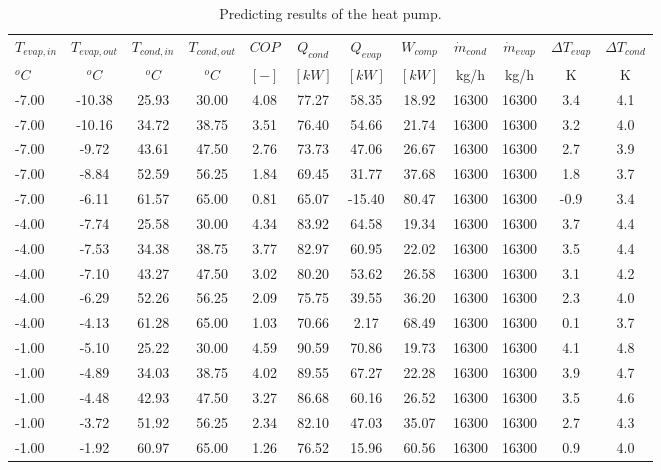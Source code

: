 \documentclass[english]{SPFShortReport}
\begin{document}
\begin{table}[!ht]
\begin{small}
\caption{Predicting results of the heat pump.}
\begin{center}
\resizebox{12cm}{!} 
{
\begin{tabular}{l | c c c c c c c c c c c } 
\hline
\hline
$T_{evap,in}$ &$T_{evap,out}$ &$T_{cond,in}$ &$T_{cond,out}$ &$COP$ &$Q_{cond}$ &$Q_{evap}$ &$W_{comp}$ &$\dot m_{cond}$ &$\dot m_{evap}$ &$\Delta T_{evap}$ &$\Delta T_{cond}$ \\ 
$^oC$ &$^oC$ &$^oC$ &$^oC$ &$[-]$ &$[kW]$ &$[kW]$ &$[kW]$ &kg/h &kg/h &K &K\\ 
\hline
-7.00 & -10.38 & 25.93 & 30.00 & 4.08 & 77.27 & 58.35 & 18.92 & 16300 & 16300 & 3.4 & 4.1\\ 
-7.00 & -10.16 & 34.72 & 38.75 & 3.51 & 76.40 & 54.66 & 21.74 & 16300 & 16300 & 3.2 & 4.0\\ 
-7.00 & -9.72 & 43.61 & 47.50 & 2.76 & 73.73 & 47.06 & 26.67 & 16300 & 16300 & 2.7 & 3.9\\ 
-7.00 & -8.84 & 52.59 & 56.25 & 1.84 & 69.45 & 31.77 & 37.68 & 16300 & 16300 & 1.8 & 3.7\\ 
-7.00 & -6.11 & 61.57 & 65.00 & 0.81 & 65.07 & -15.40 & 80.47 & 16300 & 16300 & -0.9 & 3.4\\ 
-4.00 & -7.74 & 25.58 & 30.00 & 4.34 & 83.92 & 64.58 & 19.34 & 16300 & 16300 & 3.7 & 4.4\\ 
-4.00 & -7.53 & 34.38 & 38.75 & 3.77 & 82.97 & 60.95 & 22.02 & 16300 & 16300 & 3.5 & 4.4\\ 
-4.00 & -7.10 & 43.27 & 47.50 & 3.02 & 80.20 & 53.62 & 26.58 & 16300 & 16300 & 3.1 & 4.2\\ 
-4.00 & -6.29 & 52.26 & 56.25 & 2.09 & 75.75 & 39.55 & 36.20 & 16300 & 16300 & 2.3 & 4.0\\ 
-4.00 & -4.13 & 61.28 & 65.00 & 1.03 & 70.66 & 2.17 & 68.49 & 16300 & 16300 & 0.1 & 3.7\\ 
-1.00 & -5.10 & 25.22 & 30.00 & 4.59 & 90.59 & 70.86 & 19.73 & 16300 & 16300 & 4.1 & 4.8\\ 
-1.00 & -4.89 & 34.03 & 38.75 & 4.02 & 89.55 & 67.27 & 22.28 & 16300 & 16300 & 3.9 & 4.7\\ 
-1.00 & -4.48 & 42.93 & 47.50 & 3.27 & 86.68 & 60.16 & 26.52 & 16300 & 16300 & 3.5 & 4.6\\ 
-1.00 & -3.72 & 51.92 & 56.25 & 2.34 & 82.10 & 47.03 & 35.07 & 16300 & 16300 & 2.7 & 4.3\\ 
-1.00 & -1.92 & 60.97 & 65.00 & 1.26 & 76.52 & 15.96 & 60.56 & 16300 & 16300 & 0.9 & 4.0\\ 

\end{tabular}}
\end{center}
\end{small}
\end{table}
\end{document}
